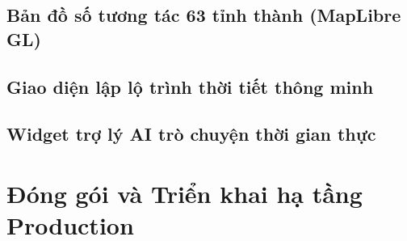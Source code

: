 \subsection{Bản đồ số tương tác 63 tỉnh thành (MapLibre GL)}

\subsection{Giao diện lập lộ trình thời tiết thông minh}

\subsection{Widget trợ lý AI trò chuyện thời gian thực}

\section{Đóng gói và Triển khai hạ tầng Production}

